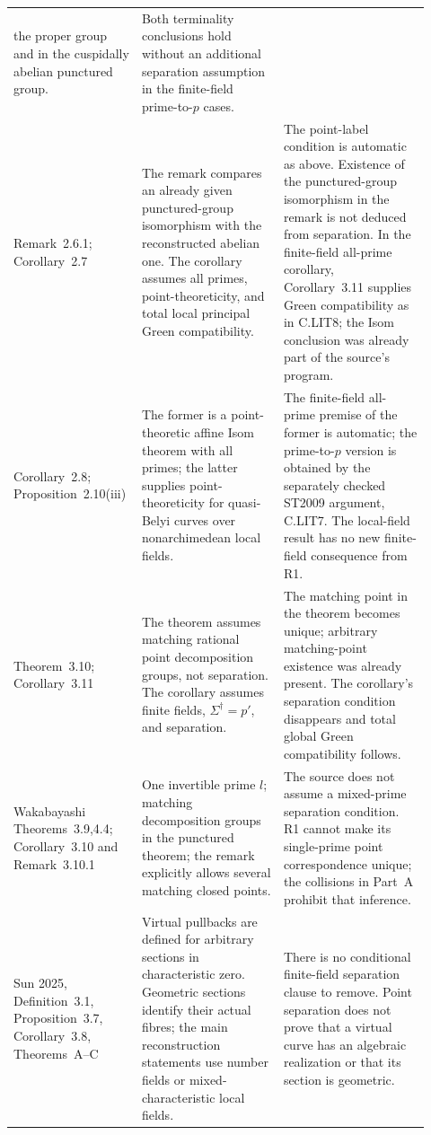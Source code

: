 \begin{center}
\begin{longtable}{p{0.25\linewidth}p{0.33\linewidth}p{0.34\linewidth}}
the proper group and in the cuspidally abelian punctured group.&
Both terminality conclusions hold without an additional
separation assumption in the finite-field prime-to-$p$ cases.\\
Remark~2.6.1; Corollary~2.7&
The remark compares an already given punctured-group
isomorphism with the reconstructed abelian one. The corollary
assumes all primes, point-theoreticity, and total local principal
Green compatibility.&
The point-label condition is automatic as above. Existence of
the punctured-group isomorphism in the remark is not deduced
from separation. In the finite-field all-prime corollary,
Corollary~3.11 supplies Green compatibility as in C.LIT8;
the Isom conclusion was already part of the source's program.\\
Corollary~2.8; Proposition~2.10(iii)&
The former is a point-theoretic affine Isom theorem with all
primes; the latter supplies point-theoreticity for quasi-Belyi
curves over nonarchimedean local fields.&
The finite-field all-prime premise of the former is automatic;
the prime-to-$p$ version is obtained by the separately checked
ST2009 argument, C.LIT7. The local-field result has no new
finite-field consequence from R1.\\
Theorem~3.10; Corollary~3.11&
The theorem assumes matching rational point decomposition
groups, not separation. The corollary assumes finite fields,
$\Sigma^\dagger=p'$, and separation.&
The matching point in the theorem becomes unique; arbitrary
matching-point existence was already present. The corollary's
separation condition disappears and total global Green
compatibility follows.\\
Wakabayashi Theorems~3.9,4.4; Corollary~3.10 and
Remark~3.10.1&
One invertible prime $l$; matching decomposition groups in the
punctured theorem; the remark explicitly allows several
matching closed points.&
The source does not assume a mixed-prime separation condition.
R1 cannot make its single-prime point correspondence unique;
the collisions in Part~A prohibit that inference.\\
Sun 2025, Definition~3.1, Proposition~3.7, Corollary~3.8,
Theorems~A--C&
Virtual pullbacks are defined for arbitrary sections in
characteristic zero. Geometric sections identify their actual
fibres; the main reconstruction statements use number fields
or mixed-characteristic local fields.&
There is no conditional finite-field separation clause to
remove. Point separation does not prove that a virtual curve
has an algebraic realization or that its section is geometric.\\

\end{longtable}
\end{center}
